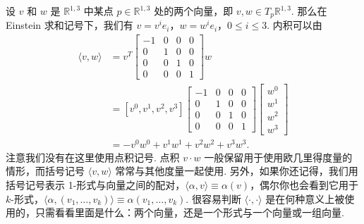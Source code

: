 设 $v$ 和 $w$ 是 $\mathbb{R}^{1,3}$ 中某点 $p\in\mathbb{R}^{1,3}$ 处的两个向量，即 $v,w\in T_p\mathbb{R}^{1,3}$. 那么在 Einstein 求和记号下，我们有 $v=v^ie_i$，$w=w^ie_i$，$0\leq i\leq3$. 内积可以由
\[
\begin{aligned}
\langle v,w\rangle
&=v^T\begin{bmatrix}-1&0&0&0\\0&1&0&0\\0&0&1&0\\0&0&0&1\end{bmatrix}w\\
&=[v^0,v^1,v^2,v^3]\begin{bmatrix}-1&0&0&0\\0&1&0&0\\0&0&1&0\\0&0&0&1\end{bmatrix}\begin{bmatrix}w^0\\w^1\\w^2\\w^3\end{bmatrix}\\
&=-v^0w^0+v^1w^1+v^2w^2+v^3w^3 .
\end{aligned}
\]
注意我们没有在这里使用点积记号. 点积 $v\cdot w$ 一般保留用于使用欧几里得度量的情形，而括号记号 $\langle v,w\rangle$ 常常与其他度量一起使用. 另外，如果你还记得，我们用括号记号表示 1-形式与向量之间的配对，$\langle\alpha,v\rangle\equiv\alpha(v)$，偶尔你也会看到它用于 $k$-形式，$\langle\alpha,(v_1,\ldots,v_k)\rangle\equiv\alpha(v_1,\ldots,v_k)$. 很容易判断 $\langle\cdot,\cdot\rangle$ 是在何种意义上被使用的，只需看看里面是什么：两个向量，还是一个形式与一个向量或一组向量.

